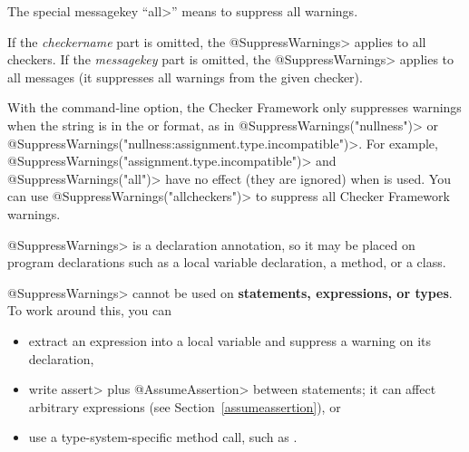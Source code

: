 The special messagekey ``\<all>'' means to suppress all warnings.

If the \emph{checkername} part is omitted, the \<@SuppressWarnings> applies
to all checkers.
If the \emph{messagekey} part is omitted, the \<@SuppressWarnings> applies
to all messages (it suppresses all warnings from the given checker).

With the  command-line
option, the Checker Framework only suppresses warnings when the string is in
the  or 
format, as in
\<@SuppressWarnings("nullness")> or
\<@SuppressWarnings("nullness:assignment.type.incompatible")>.
For example, \<@SuppressWarnings("assignment.type.incompatible")> and
\<@SuppressWarnings("all")> have no effect (they are ignored) when
 is used.  You can use
\<@SuppressWarnings("allcheckers")> to suppress all Checker Framework
warnings.

%



\<@SuppressWarnings> is a declaration annotation, so it may be placed on
program declarations such as a local variable declaration, a method, or a
class.

\<@SuppressWarnings> cannot be used on \textbf{statements, expressions, or types}.
To work around this, you can
\begin{itemize}
\item
  extract an expression into a local variable
  and suppress a warning on its declaration,
\item
  write \<assert> plus \<@AssumeAssertion> between statements; it can
  affect arbitrary expressions (see Section~\ref{assumeassertion}), or
\item
  use a type-system-specific method call, such as
  .
\end{itemize}

